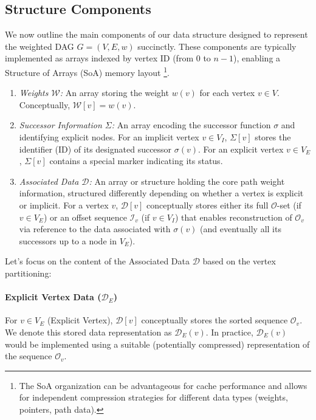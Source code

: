 \subsection{Structure Components}
\label{subsec:structure_components}

We now outline the main components of our data structure designed to represent the weighted DAG $G=(V,E,w)$ succinctly. These components are typically implemented as arrays indexed by vertex ID (from $0$ to $n-1$), enabling a Structure of Arrays (SoA) memory layout \footnote{The SoA organization can be advantageous for cache performance and allows for independent compression strategies for different data types (weights, pointers, path data).}.

\begin{enumerate}
    \item \emph{Weights $\mathcal{W}$:} An array storing the weight $w(v)$ for each vertex $v \in V$. Conceptually, $\mathcal{W}[v] = w(v)$.
    \item \emph{Successor Information $\Sigma$:} An array encoding the successor function $\sigma$ and identifying explicit nodes. For an implicit vertex $v \in V_I$, $\Sigma[v]$ stores the identifier (ID) of its designated successor $\sigma(v)$. For an explicit vertex $v \in V_E$, $\Sigma[v]$ contains a special marker indicating its status.
    \item \emph{Associated Data $\mathcal{D}$:} An array or structure holding the core path weight information, structured differently depending on whether a vertex is explicit or implicit. For a vertex $v$, $\mathcal{D}[v]$ conceptually stores either its full $\mathcal{O}$-set (if $v \in V_E$) or an offset sequence $\mathcal{I}_v$ (if $v \in V_I$) that enables reconstruction of $\mathcal{O}_v$ via reference to the data associated with $\sigma(v)$ (and eventually all its successors up to a node in $V_E$).
\end{enumerate}

Let's focus on the content of the Associated Data $\mathcal{D}$ based on the vertex partitioning:

\paragraph{Explicit Vertex Data ($\mathcal{D}_E$)}
For $v \in V_E$ (Explicit Vertex), $\mathcal{D}[v]$ conceptually stores the sorted sequence $\mathcal{O}_v$. We denote this stored data representation as $\mathcal{D}_E(v)$. In practice, $\mathcal{D}_E(v)$ would be implemented using a suitable (potentially compressed) representation of the sequence $\mathcal{O}_v$.

